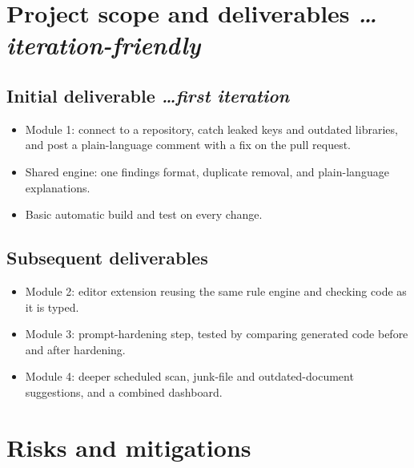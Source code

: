 \documentclass[11pt,a4paper]{article}
\newcommand{\BvrHint}[1]{%
  {\normalfont\normalsize\itshape\hfill #1}}
\begin{document}
\section{Project scope and deliverables
  \BvrHint{\ldots iteration-friendly}}

\subsection{Initial deliverable
  \BvrHint{\ldots first iteration}}

\begin{itemize}[leftmargin=0.7cm]

    \item Module 1: connect to a repository, catch leaked keys and outdated libraries, and post a plain-language comment with a fix on the pull request.

    \item Shared engine: one findings format, duplicate removal, and plain-language explanations.

    \item Basic automatic build and test on every change.

\end{itemize}

\subsection{Subsequent deliverables}

\begin{itemize}[leftmargin=0.7cm]

    \item Module 2: editor extension reusing the same rule engine and checking code as it is typed.

    \item Module 3: prompt-hardening step, tested by comparing generated code before and after hardening.

    \item Module 4: deeper scheduled scan, junk-file and outdated-document suggestions, and a combined dashboard.

\end{itemize}

\section{Risks and mitigations}
\end{document}
